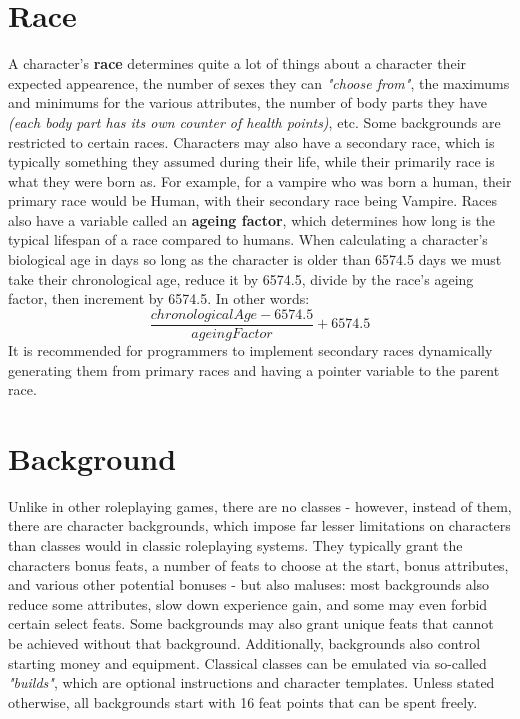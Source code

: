 \documentclass[tikz,openany,11pt,a4paper]{book}
\begin{document}
\section{Race}
A character's \textbf{race} determines quite a lot of things about a character \textemdash their expected appearence, the number of sexes they can \textit{"choose from"}, the maximums and minimums for the various attributes, the number of body parts they have \textit{(each body part has its own counter of health points)}, etc. Some backgrounds are restricted to certain races.\newline
Characters may also have a secondary race, which is typically something they assumed during their life, while their primarily race is what they were born as. For example, for a vampire who was born a human, their primary race would be Human, with their secondary race being Vampire.\newline
Races also have a variable called an \textbf{ageing factor}, which determines how long is the typical lifespan of a race compared to humans. When calculating a character's biological age in days \textemdash so long as the character is older than 6574.5 days \textemdash we must take their chronological age, reduce it by 6574.5, divide by the race's ageing factor, then increment by 6574.5. In other words: \[\frac{chronologicalAge-6574.5}{ageingFactor}+6574.5\]
It is recommended for programmers to implement secondary races dynamically generating them from primary races and having a pointer variable to the parent race. 
\section{Background}
Unlike in other roleplaying games, there are no classes - however, instead of them, there are character backgrounds, which impose far lesser limitations on characters than classes would in classic roleplaying systems. They typically grant the characters bonus feats, a number of feats to choose at the start, bonus attributes, and various other potential bonuses - but also maluses: most backgrounds also reduce some attributes, slow down experience gain, and some may even forbid certain select feats. Some backgrounds may also grant unique feats that cannot be achieved without that background. Additionally, backgrounds also control starting money and equipment.\newline
Classical classes can be emulated via so-called \textit{"builds"}, which are optional instructions and character templates.\newline
Unless stated otherwise, all backgrounds start with 16 feat points that can be spent freely.
\end{document}
